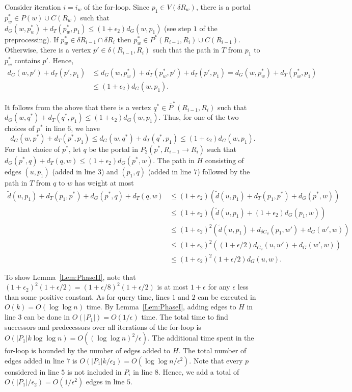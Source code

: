 \documentclass[11pt]{article}
\begin{document}
Consider iteration $i = i_w$ of the for-loop. Since $p_1\in V(\delta R_w)$, there is a portal $p_w^*\in P(w)\cup C(R_w)$ such that $d_G(w,p_w^*) + d_T(p_w^*,p_1)\leq (1+\epsilon_2)d_G(w,p_1)$ (see step $1$ of the preprocessing). If $p_w^*\in\delta R_{i-1}\cap\delta R_i$ then $p_w^*\in P^*(R_{i-1},R_i)\cup C(R_{i-1})$. Otherwise, there is a vertex $p'\in\delta(R_{i-1},R_i)$ such that the path in $T$ from $p_1$ to $p_w^*$ contains $p'$. Hence,
\begin{align*}
d_G(w,p') + d_T(p',p_1) & \leq d_G(w,p_w^*) + d_T(p_w^*,p') + d_T(p',p_1) = d_G(w,p_w^*) + d_T(p_w^*,p_1)\\
 & \leq (1+\epsilon_2)d_G(w,p_1).
\end{align*}

It follows from the above that there is a vertex $q^*\in\overline{P}^*(R_{i-1},R_i)$ such that $d_G(w,q^*) + d_T(q^*,p_1)\leq (1+\epsilon_2)d_G(w,p_1)$. Thus, for one of the two choices of $p^*$ in line $6$, we have
\[
  d_G(w,p^*) + d_T(p^*,p_1) \leq d_G(w,q^*) + d_T(q^*,p_1) \leq (1+\epsilon_2)d_G(w,p_1).
\]
For that choice of $p^*$, let $q$ be the portal in $P_2(p^*,R_{i-1}\rightarrow R_i)$ such that $d_G(p^*,q) + d_T(q,w)\leq (1+\epsilon_2)d_G(p^*,w)$. The path in $H$ consisting of edges $(u,p_1)$ (added in line $3$) and $(p_1,q)$ (added in line $7$) followed by the path in $T$ from $q$ to $w$ has weight at most
\begin{align*}
\tilde{d}(u,p_1) + d_T(p_1,p^*) + d_G(p^*,q) + d_T(q,w) & \leq (1+\epsilon_2)(\tilde{d}(u,p_1) + d_T(p_1,p^*) + d_G(p^*,w))\\
 & \leq (1+\epsilon_2)(\tilde{d}(u,p_1) + (1+\epsilon_2)d_G(p_1,w))\\
 & \leq (1+\epsilon_2)^2(\tilde{d}(u,p_1) + d_{\delta C_u}(p_1,w') + d_G(w',w))\\
 & \leq (1+\epsilon_2)^2((1+\epsilon/2)d_{C_u}(u,w') + d_G(w',w))\\
 & \leq (1+\epsilon_2)^2(1+\epsilon/2)d_G(u,w).
\end{align*}

To show Lemma~\ref{Lem:PhaseII}, note that $(1+\epsilon_2)^2(1+\epsilon/2) = (1+\epsilon/8)^2(1+\epsilon/2)$ is at most $1+\epsilon$ for any $\epsilon$ less than some positive constant. As for query time, lines $1$ and $2$ can be executed in $O(k) = O(\log\log n)$ time. By Lemma~\ref{Lem:PhaseI}, adding edges to $H$ in line $3$ can be done in $O(|P_1|) = O(1/\epsilon)$ time. The total time to find successors and predecessors over all iterations of the for-loop is $O(|P_1|k\log\log n) = O((\log\log n)^2/\epsilon)$. The additional time spent in the for-loop is bounded by the number of edges added to $H$. The total number of edges added in line $7$ is $O(|P_1|k/\epsilon_2) = O(\log\log n/\epsilon^2)$. Note that every $p$ considered in line $5$ is not included in $P_i$ in line $8$. Hence, we add a total of $O(|P_1|/\epsilon_2) = O(1/\epsilon^2)$ edges in line $5$.
\end{document}
